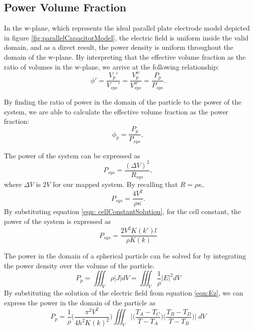 \subsection*{Power Volume Fraction}
\par In the w-plane, which represents the ideal parallel plate electrode model depicted in figure \ref{fig:parallelCapacitorModel}, the electric field is uniform inside the valid domain, and as a direct result, the power density is uniform throughout the domain of the w-plane. By interpreting that the effective volume fraction as the ratio of volumes in the w-plane, we arrive at the following relationship:
\begin{equation}
    \phi ' = \frac{V_p'}{V_{sys}'} = \frac{V^w_p}{V^w_{sys}} = \frac{P_p}{P_{sys}}.
    \label{eqn: effectiveVolumeFractions}
\end{equation}

\par By finding the ratio of power in the domain of the particle to the power of the system, we are able to calculate the effective volume fraction as the power fraction:
\begin{equation}
    \phi_p = \frac{P_p}{P_{sys}},
    \label{eqn: powerVolumeFraction_initial}
\end{equation}

\noindent The power of the system can be expressed as
\begin{equation}
    P_{sys} = \frac{(\Delta V)^2}{R_{sys}},
\end{equation}
\noindent where $\Delta V$ is $2V$ for our mapped system. By recalling that $R=\rho\kappa$,
\begin{equation}
    P_{sys} = \frac{4V^2}{\rho\kappa}.
\end{equation}
\noindent By substituting equation \ref{eqn: cellConstantSolution}, for the cell constant, the power of the system is expressed as 
\begin{equation}
    P_{sys} = \frac{2V^2K(k')l}{\rho K(k)}
    \label{eqn: powerSystem}
\end{equation}

\par The power in the domain of a spherical particle can be solved for by integrating the power density over the volume of the particle.
\begin{equation}
    P_p = \iiint_V \rho \big| J \big| dV = \iiint_V \frac{1}{\rho} \big| E \big|^2 dV
\end{equation}
\noindent By substituting the solution of the electric field from equation \ref{eqn:Ez}, we can express the power in the domain of the particle as
\begin{equation}
    P_p = \frac{1}{\rho}\bigg(\frac{\pi^2 V^2}{4h^2K(k)^2}\bigg)\iiint_V \bigg|\bigg(\frac{T_A-T_C}{T-T_A}\bigg)\bigg(\frac{T_B-T_D}{T-T_B}\bigg)\bigg| \;dV
    \label{eqn: powerParticle}
\end{equation}

